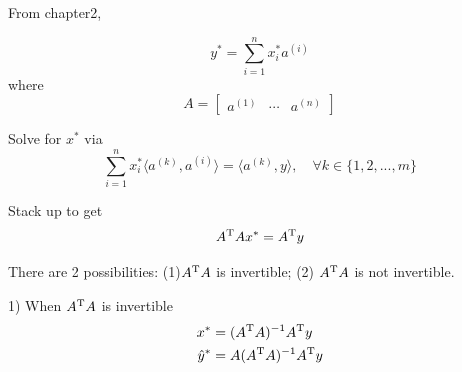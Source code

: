 From chapter2, 

\begin{equation*}
y^* = \sum^n_{i=1}x_i^*a^{(i)}
\end{equation*}
where 
$$ A =   
\left[
\begin{matrix}
a^{(1)} & \cdots & a^{(n)}
\end{matrix}
\right]
$$

Solve for $x^*$ via
\begin{equation*}
\sum^n_{i=1}x_i^*\langle a^{(k)}, a^{(i)}\rangle = \langle a^{(k)}, y\rangle, \quad \forall k \in \{1,2,...,m \}
\end{equation*}

Stack up to get 
\begin{equation*}
A^{{\rm T}}Ax^* = A^{{\rm T}}y
\end{equation*}

There are 2 possibilities: (1)$A^{{\rm T}}A$ is invertible; (2) $A^{{\rm T}}A$ is not invertible.

1) When $A^{{\rm T}}A$ is invertible
\begin{align*}
x^* &= (A^{{\rm T}}A)^{-1}A^{{\rm T}}y\\
\hat{y}^* &= A(A^{{\rm T}}A)^{-1}A^{{\rm T}}y
\end{align*}

